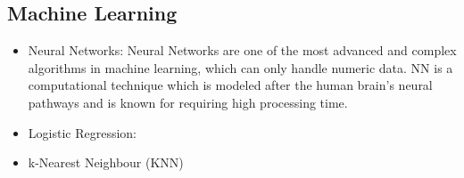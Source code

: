 \subsection{Machine Learning}
\begin{itemize}
    \item Neural Networks:
    Neural Networks are one of the most advanced and complex algorithms in machine learning, which can only handle numeric data. NN is a computational technique which is modeled after the human brain’s neural pathways \cite{wimmer2014comparison} and is known for requiring high processing time.
    \item Logistic Regression:
    
    \item k-Nearest Neighbour (KNN)
    
\end{itemize}
